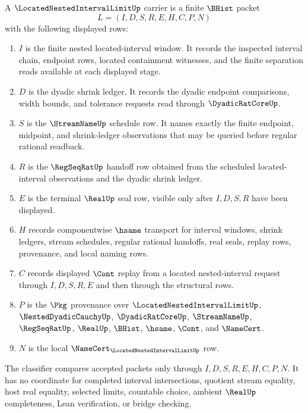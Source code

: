 \begin{definition}
\label{def:located-nested-interval-limit-carrier}
A $\LocatedNestedIntervalLimitUp$ carrier is a finite $\BHist$ packet
$$
L=(I,D,S,R,E,H,C,P,N)
$$
with the following displayed rows:
\begin{enumerate}
\item $I$ is the finite nested located-interval window. It records the inspected interval chain, endpoint rows, located containment witnesses, and the finite separation reads available at each displayed stage.
\item $D$ is the dyadic shrink ledger. It records the dyadic endpoint comparisons, width bounds, and tolerance requests read through $\DyadicRatCoreUp$.
\item $S$ is the $\StreamNameUp$ schedule row. It names exactly the finite endpoint, midpoint, and shrink-ledger observations that may be queried before regular rational readback.
\item $R$ is the $\RegSeqRatUp$ handoff row obtained from the scheduled located-interval observations and the dyadic shrink ledger.
\item $E$ is the terminal $\RealUp$ seal row, visible only after $I,D,S,R$ have been displayed.
\item $H$ records componentwise $\hsame$ transport for interval windows, shrink ledgers, stream schedules, regular rational handoffs, real seals, replay rows, provenance, and local naming rows.
\item $C$ records displayed $\Cont$ replay from a located nested-interval request through $I,D,S,R,E$ and then through the structural rows.
\item $P$ is the $\Pkg$ provenance over $\LocatedNestedIntervalLimitUp$, $\NestedDyadicCauchyUp$, $\DyadicRatCoreUp$, $\StreamNameUp$, $\RegSeqRatUp$, $\RealUp$, $\BHist$, $\hsame$, $\Cont$, and $\NameCert$.
\item $N$ is the local $\NameCert_{\LocatedNestedIntervalLimitUp}$ row.
\end{enumerate}
The classifier compares accepted packets only through $I,D,S,R,E,H,C,P,N$. It has no coordinate for completed interval intersections, quotient stream equality, host real equality, selected limits, countable choice, ambient $\RealUp$ completeness, Lean verification, or bridge checking.
\end{definition}

